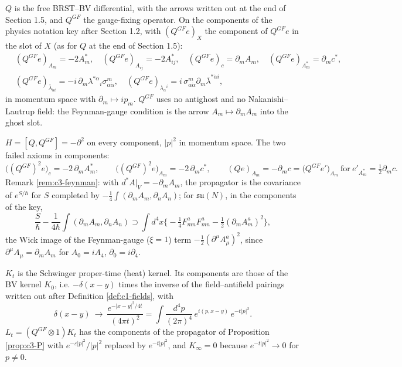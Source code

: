 \begin{remark}
$Q$ is the free BRST--BV differential, with the arrows written out at the end of Section 1.5, and $Q^{GF}$ the gauge-fixing operator. On the components of the physics notation key after Section 1.2, with $(Q^{GF}e)_X$ the component of $Q^{GF}e$ in the slot of $X$ (as for $Q$ at the end of Section 1.5):
\[
\begin{aligned}
&(Q^{GF}e)_{A_m}=-2A^*_m,\quad (Q^{GF}e)_{A_{ij}}=-2A^*_{ij},\quad (Q^{GF}e)_{c}=\partial_mA_m,\quad (Q^{GF}e)_{A^*_m}=\partial_mc^*,\\
&(Q^{GF}e)_{\bar\lambda_{\dot\alpha i}}=-i\,\partial_m\lambda^{*\alpha}{}_i\sigma^m_{\alpha\dot\alpha},\quad (Q^{GF}e)_{\lambda_\alpha{}^i}=i\,\sigma^m_{\alpha\dot\alpha}\partial_m\bar\lambda^{*\dot\alpha i},
\end{aligned}
\]
in momentum space with $\partial_m\mapsto ip_m$. $Q^{GF}$ uses no antighost and no Nakanishi--Lautrup field: the Feynman-gauge condition is the arrow $A_m\mapsto\partial_mA_m$ into the ghost slot.
\end{remark}

\begin{remark}
$H=[Q,Q^{GF}]=-\partial^2$ on every component, $|p|^2$ in momentum space. The two failed axioms in components:
\[
\big((Q^{GF})^2e\big)_{c}=-2\,\partial_mA^*_m,\qquad \big((Q^{GF})^2e\big)_{A_m}=-2\,\partial_mc^*,\qquad (Qe)_{A_m}=-\partial_mc=\big(Q^{GF}e'\big)_{A_m}\ \text{for}\ e'_{A^*_m}=\tfrac12\partial_mc.
\]
Remark \ref{rem:c3-feynman}: with $d^*A|_V=-\partial_mA_m$, the propagator is the covariance of $e^{S/\hbar}$ for $S$ completed by $-\tfrac14\int(\partial_mA_m,\partial_nA_n)$; for $\mathfrak{su}(N)$, in the components of the key,
\[
\frac S\hbar-\frac1{4\hbar}\int(\partial_mA_m,\partial_nA_n)\supset\int d^4x\Big\{-\tfrac14F^a_{mn}F^a_{mn}-\tfrac12(\partial_mA^a_m)^2\Big\},
\]
the Wick image of the Feynman-gauge ($\xi=1$) term $-\tfrac12(\partial^\mu A^a_\mu)^2$, since $\partial^\mu A_\mu=\partial_mA_m$ for $A_0=iA_4$, $\partial_0=i\partial_4$.
\end{remark}

\begin{remark}
$K_t$ is the Schwinger proper-time (heat) kernel. Its components are those of the BV kernel $K_0$, i.e. $-\delta(x-y)$ times the inverse of the field--antifield pairings written out after Definition \ref{def:c1-fields}, with
\[
\delta(x-y)\ \longrightarrow\ \frac{e^{-|x-y|^2/4t}}{(4\pi t)^2}=\int\frac{d^4p}{(2\pi)^4}\,e^{i(p,x-y)}\,e^{-t|p|^2}.
\]
$L_t=(Q^{GF}\otimes1)K_t$ has the components of the propagator of Proposition \ref{prop:c3-P} with $e^{-\varepsilon|p|^2}/|p|^2$ replaced by $e^{-t|p|^2}$, and $K_\infty=0$ because $e^{-t|p|^2}\to0$ for $p\neq0$.
\end{remark}

